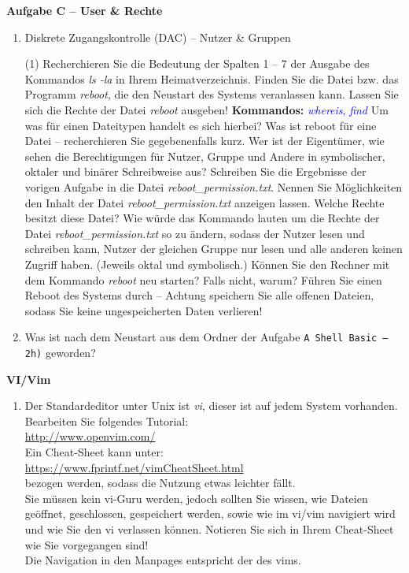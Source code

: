 \documentclass[paper=a4,fontsize=11pt]{scrartcl}%
\numberwithin{equation}{section}
\begin{document}
\begin{center}\Large{\textbf{Aufgabe C -- User \& Rechte}}\end{center}\vskip0.25in
\begin{enumerate}

\item Diskrete Zugangskontrolle (DAC) -- Nutzer \& Gruppen
	\begin{tasks}(1)
        \task Recherchieren Sie die Bedeutung der Spalten 1 -- 7 der Ausgabe des Kommandos \emph{ls -la} in Ihrem Heimatverzeichnis.
        \task Finden Sie die Datei bzw. das Programm \textit{reboot}, die den Neustart des Systems veranlassen kann. Lassen Sie sich die Rechte der Datei \textit{reboot} ausgeben!
        \textbf{Kommandos:} \textcolor{blue}{\emph{whereis}, \emph{find}}
        \task Um was für einen Dateitypen handelt es sich hierbei? Was ist reboot für eine Datei -- recherchieren Sie gegebenenfalls kurz.
        \task Wer ist der Eigentümer, wie sehen die Berechtigungen für Nutzer, Gruppe und Andere in symbolischer, oktaler und binärer Schreibweise aus?
        \task Schreiben Sie die Ergebnisse der vorigen Aufgabe in die Datei \textit{reboot\-\_permission.txt}.
        \task Nennen Sie Möglichkeiten den Inhalt der Datei \textit{reboot\-\_permission.txt} anzeigen lassen. Welche Rechte besitzt diese Datei?
        \task Wie würde das Kommando lauten um die Rechte der Datei \textit{reboot\-\_permission.txt} so zu ändern, sodass der Nutzer lesen und schreiben kann, Nutzer der gleichen Gruppe nur lesen und alle anderen keinen Zugriff haben. (Jeweils oktal und symbolisch.) 
        \task Können Sie den Rechner mit dem Kommando \textit{reboot} neu starten? Falls nicht, warum? 
        \task Führen Sie einen Reboot des Systems durch -- Achtung speichern Sie alle offenen Dateien, sodass Sie keine ungespeicherten Daten verlieren!
  \end{tasks}
  \item Was ist nach dem Neustart aus dem Ordner der Aufgabe \texttt{A Shell Basic -- 2h)} geworden?
\end{enumerate}
\begin{center}\Large{\textbf{VI/Vim}}\end{center}\vskip0.25in
\begin{enumerate}
	\item Der Standardeditor unter Unix ist \emph{vi}, dieser ist auf jedem System vorhanden. Bearbeiten Sie folgendes Tutorial:\\
	\url{http://www.openvim.com/}\\
	Ein Cheat-Sheet kann unter:\\
	\url{https://www.fprintf.net/vimCheatSheet.html}\\
	bezogen werden, sodass die Nutzung etwas leichter fällt.\\
	Sie müssen kein vi-Guru werden, jedoch sollten Sie wissen, wie Dateien geöffnet, geschlossen, gespeichert werden, sowie wie im vi/vim navigiert wird und wie Sie den vi verlassen können. Notieren Sie sich in Ihrem Cheat-Sheet wie Sie vorgegangen sind!\\
	Die Navigation in den Manpages entspricht der des vims.
\end{enumerate}
\end{document}
